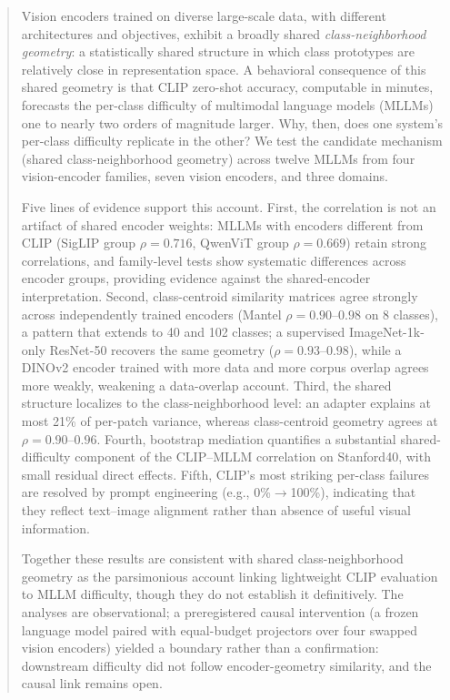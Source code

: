 \documentclass[a4paper,fleqn]{cas-sc}
\begin{document}
\begin{abstract}
Vision encoders trained on diverse large-scale data, with different architectures and objectives, exhibit a broadly shared \emph{class-neighborhood geometry}: a statistically shared structure in which class prototypes are relatively close in representation space. A behavioral consequence of this shared geometry is that CLIP zero-shot accuracy, computable in minutes, forecasts the per-class difficulty of multimodal language models (MLLMs) one to nearly two orders of magnitude larger. Why, then, does one system's per-class difficulty replicate in the other? We test the candidate mechanism (shared class-neighborhood geometry) across twelve MLLMs from four vision-encoder families, seven vision encoders, and three domains.

Five lines of evidence support this account. First, the correlation is not an artifact of shared encoder weights: MLLMs with encoders different from CLIP (SigLIP group $\rho=0.716$, QwenViT group $\rho=0.669$) retain strong correlations, and family-level tests show systematic differences across encoder groups, providing evidence against the shared-encoder interpretation. Second, class-centroid similarity matrices agree strongly across independently trained encoders (Mantel $\rho=0.90$--$0.98$ on 8 classes), a pattern that extends to 40 and 102 classes; a supervised ImageNet-1k-only ResNet-50 recovers the same geometry ($\rho=0.93$--$0.98$), while a DINOv2 encoder trained with more data and more corpus overlap agrees more weakly, weakening a data-overlap account. Third, the shared structure localizes to the class-neighborhood level: an adapter explains at most 21\% of per-patch variance, whereas class-centroid geometry agrees at $\rho=0.90$--$0.96$. Fourth, bootstrap mediation quantifies a substantial shared-difficulty component of the CLIP--MLLM correlation on Stanford40, with small residual direct effects. Fifth, CLIP's most striking per-class failures are resolved by prompt engineering (e.g., 0\%$\rightarrow$100\%), indicating that they reflect text--image alignment rather than absence of useful visual information.

Together these results are consistent with shared class-neighborhood geometry as the parsimonious account linking lightweight CLIP evaluation to MLLM difficulty, though they do not establish it definitively. The analyses are observational; a preregistered causal intervention (a frozen language model paired with equal-budget projectors over four swapped vision encoders) yielded a boundary rather than a confirmation: downstream difficulty did not follow encoder-geometry similarity, and the causal link remains open.
\end{abstract}
\end{document}
